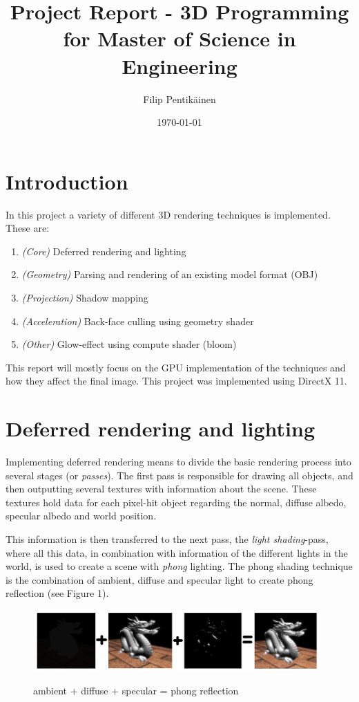 \documentclass[a4paper,11pt]{article}
\begin{document}
\title{Project Report - 3D Programming for Master of Science in Engineering}
\author{Filip Pentikäinen}
\date{\today}
\maketitle

\section{Introduction}
In this project a variety of different 3D rendering techniques is implemented. These are:
\begin{enumerate}
	\item \textit{(Core)} Deferred rendering and lighting
	\item \textit{(Geometry)} Parsing and rendering of an existing model format (OBJ)
	\item \textit{(Projection)} Shadow mapping
	\item \textit{(Acceleration)} Back-face culling using geometry shader
	\item \textit{(Other)} Glow-effect using compute shader (bloom)	
\end{enumerate}

This report will mostly focus on the GPU implementation of the techniques and how they affect the final image. This project was implemented using DirectX 11.

\newpage
\section{Deferred rendering and lighting}
Implementing deferred rendering means to divide the basic rendering process into several stages (or \textit{passes}). The first pass is responsible for drawing all objects, and then outputting several textures with information about the scene. These textures hold data for each pixel-hit object regarding the normal, diffuse albedo, specular albedo and world position.

This information is then transferred to the next pass, the \textit{light shading}-pass, where all this data, in combination with information of the different lights in the world, is used to create a scene with \textit{phong} lighting. The phong shading technique is the combination of ambient, diffuse and specular light to create phong reflection (see Figure 1). 

\begin{figure}[ht!]
	\begin{center}
		\label{phong}
		\includegraphics[width=11cm]{pic/comparison2.jpg}
		\caption{ambient + diffuse + specular = phong reflection}
	\end{center}
\end{figure}
\end{document}
